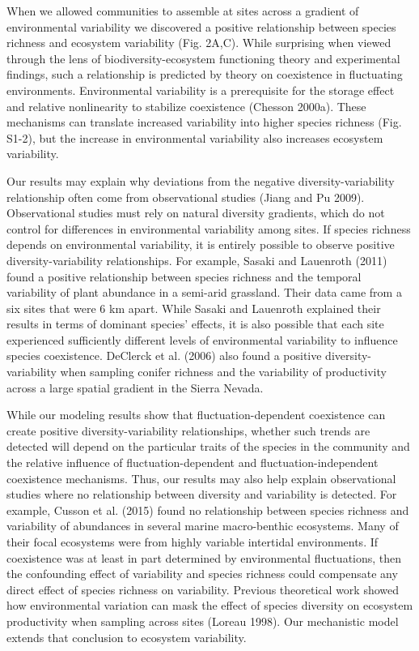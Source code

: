 \documentclass[12pt,]{article}
\begin{document}
When we allowed communities to assemble at sites across a gradient of
environmental variability we discovered a positive relationship between
species richness and ecosystem variability (Fig. 2A,C). While surprising
when viewed through the lens of biodiversity-ecosystem functioning
theory and experimental findings, such a relationship is predicted by
theory on coexistence in fluctuating environments. Environmental
variability is a prerequisite for the storage effect and relative
nonlinearity to stabilize coexistence (Chesson 2000a). These mechanisms
can translate increased variability into higher species richness (Fig.
S1-2), but the increase in environmental variability also increases
ecosystem variability.

Our results may explain why deviations from the negative
diversity-variability relationship often come from observational studies
(Jiang and Pu 2009). Observational studies must rely on natural
diversity gradients, which do not control for differences in
environmental variability among sites. If species richness depends on
environmental variability, it is entirely possible to observe positive
diversity-variability relationships. For example, Sasaki and Lauenroth
(2011) found a positive relationship between species richness and the
temporal variability of plant abundance in a semi-arid grassland. Their
data came from a six sites that were 6 km apart. While Sasaki and
Lauenroth explained their results in terms of dominant species' effects,
it is also possible that each site experienced sufficiently different
levels of environmental variability to influence species coexistence.
DeClerck et al. (2006) also found a positive diversity-variability when
sampling conifer richness and the variability of productivity across a
large spatial gradient in the Sierra Nevada.

While our modeling results show that fluctuation-dependent coexistence
can create positive diversity-variability relationships, whether such
trends are detected will depend on the particular traits of the species
in the community and the relative influence of fluctuation-dependent and
fluctuation-independent coexistence mechanisms. Thus, our results may
also help explain observational studies where no relationship between
diversity and variability is detected. For example, Cusson et al. (2015)
found no relationship between species richness and variability of
abundances in several marine macro-benthic ecosystems. Many of their
focal ecosystems were from highly variable intertidal environments. If
coexistence was at least in part determined by environmental
fluctuations, then the confounding effect of variability and species
richness could compensate any direct effect of species richness on
variability. Previous theoretical work showed how environmental
variation can mask the effect of species diversity on ecosystem
productivity when sampling across sites (Loreau 1998). Our mechanistic
model extends that conclusion to ecosystem variability.
\end{document}
